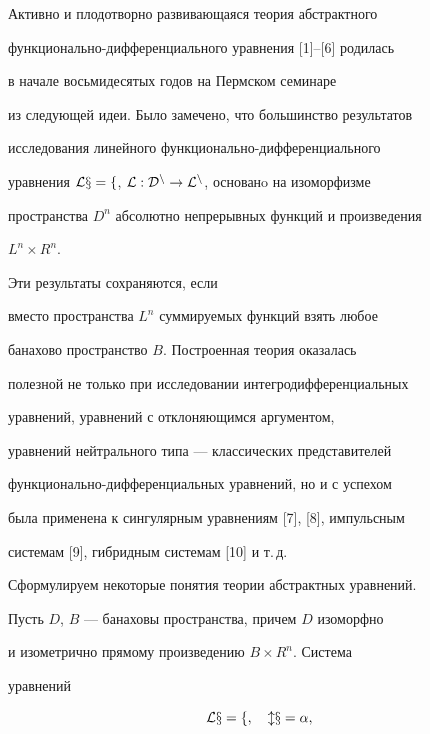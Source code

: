 \label{begin} 


 


 


Активно и плодотворно развивающаяся теория абстрактного  


функционально-диф\-фе\-рен\-ци\-аль\-ного уравнения [1]--[6] родилась  


в начале восьмидесятых годов на Пермском семинаре  


из следующей идеи. Было замечено, что большинство результатов  


исследования линейного функционально-дифференциального  


уравнения $\cal L x=f$, $\cal L:D^n\to L^n$, основанo на изоморфизме 


пространства $D^n$ абсолютно непрерывных функций и произведения


$L^n\times R^n$. 


Эти результаты сохраняются, если  


вместо пространства $L^n$ суммируемых функций взять любое  


банахово пространство $B$. Построенная теория оказалась  


полезной не только при исследовании интегродифференциальных  


уравнений, уравнений с отклоняющимся аргументом,  


уравнений нейтрального типа --- классических представителей  


функционально-дифференциальных уравнений, но и с успехом  


была применена к сингулярным уравнениям [7], [8], импульсным  


системам [9], гибридным системам [10] и т.\,д. 


 


Сформулируем некоторые понятия теории абстрактных уравнений. 


 


Пусть $D$, $B$ --- банаховы пространства, причем $D$ изоморфно  


и изометрично прямому произведению $B\times R^n$. Система 


уравнений 


\begin{equation} 


\cal L x=f,\quad l x=\alpha ,


\end{equation} 



